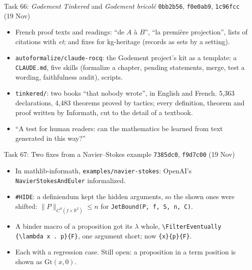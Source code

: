 \documentclass[10pt,aspectratio=169]{beamer}
\newcommand{\bad}[1]{\textcolor{warn}{#1}}
\newcommand{\ok}[1]{\textcolor{good}{#1}}
\newcommand{\commit}[1]{\texttt{\footnotesize #1}}
\begin{document}
\begin{frame}{Task 66: \emph{Godement Tinkered} and \emph{Godement bricolé}}
  \commit{0bb2b56}, \commit{f0e0ab9}, \commit{1c96fcc} (19 Nov)
  \begin{itemize}\small
    \item French proof texts and readings: ``de $A$ à $B$'', ``la première projection'', lists of
          citations with \emph{et}; and fixes for kg-heritage (records as sets by a setting).
    \item \texttt{autoformalize/claude-rocq}: the Godement project's kit as a template: a
          \texttt{CLAUDE.md}, five skills (formalize a chapter, pending statements, merge, test a
          wording, faithfulness audit), scripts.
    \item \texttt{tinkered/}: \ok{two books ``that nobody wrote''}, in English and French. 5,363
          declarations, 4,483 theorems proved by tactics; every definition, theorem and proof
          written by Informath, cut to the detail of a textbook.
    \item ``A test for human readers: can the mathematics be learned from text generated in
          this way?''
  \end{itemize}
\end{frame}

\begin{frame}{Task 67: Two fixes from a Navier--Stokes example}
  \commit{7385dc0}, \commit{f9d7c00} (19 Nov)
  \begin{itemize}\small
    \item In mathlib-informath, \texttt{examples/navier-stokes}: OpenAI's \texttt{NavierStokesAndEuler}
          informalized.
    \item \texttt{\#HIDE}: a definiendum kept the hidden arguments, so the shown ones were shifted:
          \bad{$\|P\|_{C^S(f \times \mathbb{R}^2)} \leq n$} for \texttt{JetBound(P, f, S, n, C)}.
    \item A binder macro of a proposition got its $\lambda$ whole,
          \bad{\texttt{\textbackslash FilterEventually \{\textbackslash lambda x . p\}\{F\}}}, one
          argument short; now \ok{\texttt{\{x\}\{p\}\{F\}}}.
    \item Each with a regression case. Still open: a proposition in a term position is shown as
          $\mathrm{Gt}(x, 0)$.
  \end{itemize}
\end{frame}

\end{document}
